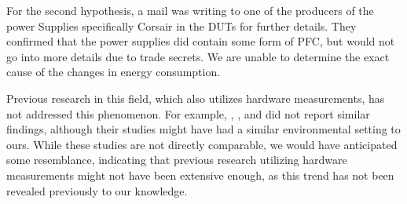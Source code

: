 
 For the second hypothesis, a mail was writing to one of the producers of the power Supplies specifically Corsair in the DUTs for further details. They confirmed that the power supplies did contain some form of PFC, but would not go into more details due to trade secrets.
We are unable to determine the exact cause of the changes in energy consumption.

Previous research in this field, which also utilizes hardware measurements, has not addressed this phenomenon. For example, \cite{georgiou2020energy}, \cite{Koedijk2022diff}, and \cite{khan2018rapl} did not report similar findings, although their studies might have had a similar environmental setting to ours. While these studies are not directly comparable, we would have anticipated some resemblance, indicating that previous research utilizing hardware measurements might not have been extensive enough, as this trend has not been revealed previously to our knowledge.

